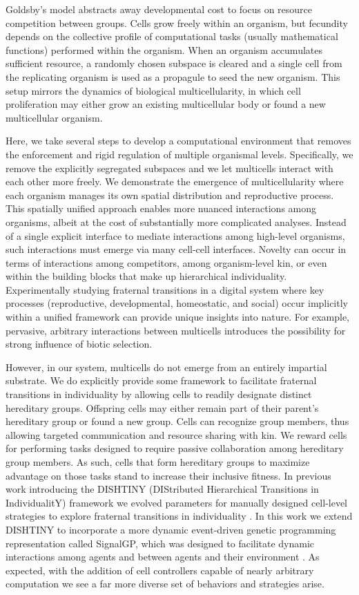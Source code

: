 Goldsby's model abstracts away developmental cost to focus on resource competition between groups.
Cells grow freely within an organism, but fecundity depends on the collective profile of computational tasks (usually mathematical functions) performed within the organism.
When an organism accumulates sufficient resource, a randomly chosen subspace is cleared and a single cell from the replicating organism is used as a propagule to seed the new organism.
This setup mirrors the dynamics of biological multicellularity, in which cell proliferation may either grow an existing multicellular body or found a new multicellular organism.

Here, we take several steps to develop a computational environment that removes the enforcement and rigid regulation of multiple organismal levels.
Specifically, we remove the explicitly segregated subspaces and we let multicells interact with each other more freely.
We demonstrate the emergence of multicellularity where each organism manages its own spatial distribution and reproductive process.
This spatially unified approach enables more nuanced interactions among organisms, albeit at the cost of substantially more complicated analyses.
Instead of a single explicit interface to mediate interactions among high-level organisms, such interactions must emerge via many cell-cell interfaces.
Novelty can occur in terms of interactions among competitors, among organism-level kin, or even within the building blocks that make up hierarchical individuality.
Experimentally studying fraternal transitions in a digital system where key processes (reproductive, developmental, homeostatic, and social) occur implicitly within a unified framework can provide unique insights into nature.
For example, pervasive, arbitrary interactions between multicells introduces the possibility for strong influence of biotic selection.

However, in our system, multicells do not emerge from an entirely impartial substrate.
We do explicitly provide some framework to facilitate fraternal transitions in individuality by allowing cells to readily designate distinct hereditary groups.
Offspring cells may either remain part of their parent's hereditary group or found a new group.
Cells can recognize group members, thus allowing targeted communication and resource sharing with kin.
We reward cells for performing tasks designed to require passive collaboration among hereditary group members.
As such, cells that form hereditary groups to maximize advantage on those tasks stand to increase their inclusive fitness.
In previous work introducing the DISHTINY (DIStributed Hierarchical Transitions in IndividualitY) framework we evolved parameters for manually designed cell-level strategies to explore fraternal transitions in individuality \citep{moreno2019toward}.
In this work we extend DISHTINY to incorporate a more dynamic event-driven genetic programming representation called SignalGP, which was designed to facilitate dynamic interactions among agents and between agents and their environment \citep{lalejini2018evolving}.
As expected, with the addition of cell controllers capable of nearly arbitrary computation we see a far more diverse set of behaviors and strategies arise.

